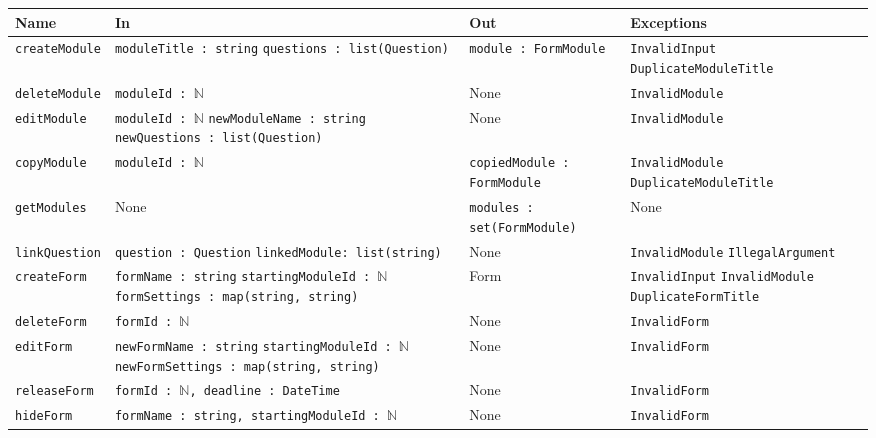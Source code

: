 \documentclass[12pt, titlepage]{article}
\begin{document}
\begin{center}
\begin{tabularx}{\textwidth}{p{} p{} p{} p{}}
\hline
\textbf{Name} & \textbf{In} & \textbf{Out} & \textbf{Exceptions} \\
\hline
\texttt{createModule} & \texttt{moduleTitle : string} \newline \texttt{questions : list(Question)} & \texttt{module : FormModule} & \texttt{InvalidInput} \newline \texttt{DuplicateModuleTitle} \\
\hline
\texttt{deleteModule} & \texttt{moduleId : $\mathbb{N}$} & None & \texttt{InvalidModule} \\
\hline
\texttt{editModule} & \texttt{moduleId : $\mathbb{N}$} \newline \texttt{newModuleName : string} \newline \texttt{newQuestions : list(Question)} & None & \texttt{InvalidModule}  \\
\hline
\texttt{copyModule} & \texttt{moduleId : $\mathbb{N}$} & \texttt{copiedModule : FormModule } & \texttt{InvalidModule} \newline \texttt{DuplicateModuleTitle} \\
\hline
\texttt{getModules} & None & \texttt{modules : set(FormModule)} & None  \\
\hline
\texttt{linkQuestion} & \texttt{question : Question} \newline \texttt{linkedModule: list(string)} & None & \texttt{InvalidModule} \newline \texttt{IllegalArgument} \\
\hline
\texttt{createForm} & \texttt{formName : string} \newline \texttt{startingModuleId : $\mathbb{N}$} \newline \texttt{formSettings : map(string, string)}  & Form & \texttt{InvalidInput} \newline \texttt{InvalidModule} \newline \texttt{DuplicateFormTitle} \\
\hline
\texttt{deleteForm} & \texttt{formId : $\mathbb{N}$} & None & \texttt{InvalidForm} \\
\hline
\texttt{editForm} & \texttt{newFormName : string} \newline \texttt{startingModuleId : $\mathbb{N}$} \newline \texttt{newFormSettings : map(string, string)}  & None & \texttt{InvalidForm} \\
\hline
\texttt{releaseForm} & \texttt{formId : $\mathbb{N}$, deadline : DateTime} & None & \texttt{InvalidForm} \\
\hline
\texttt{hideForm} & \texttt{formName : string, startingModuleId : $\mathbb{N}$} & None & \texttt{InvalidForm} \\
\hline
\end{tabularx}
\end{center}
\end{document}
